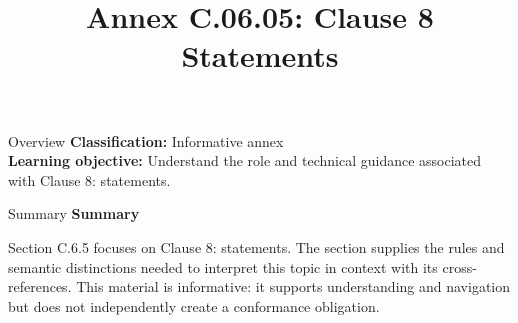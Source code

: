 \documentclass[10pt,letterpaper]{article}
\title{Annex C.06.05: Clause 8 Statements}
\author{}
\date{}
\begin{document}
\maketitle
\begin{CornellOverviewBox}{Overview}
\textbf{Classification:} Informative annex\\[2pt]
\textbf{Learning objective:} Understand the role and technical guidance associated with Clause 8: statements.
\end{CornellOverviewBox}\begin{CornellSummaryBox}{Summary}
{\sffamily\bfseries\color{Accent} Summary}\par\vspace{3pt}Section C.6.5 focuses on Clause 8: statements. The section supplies the rules and semantic distinctions needed to interpret this topic in context with its cross-references. This material is informative: it supports understanding and navigation but does not independently create a conformance obligation.
\end{CornellSummaryBox}
\end{document}
